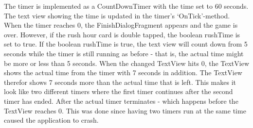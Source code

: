 The timer is implemented as a CountDownTimer with the time set to 60 seconds. The text view showing the time is updated in the timer’s ‘OnTick’-method.  When the timer reaches 0, the FinishDialogFragment appears and the game is over. However, if the rush hour card is double tapped, the boolean rushTime is set to true. If the boolean rushTime is true, the text view will count down from 5 seconds while the timer is still running as before - that is, the actual time might be more or less than 5 seconds. When the changed TextView hits 0, the TextView shows the actual time from the timer with 7 seconds in addition. The TextView therefor shows 7 seconds more than the actual time that is left. This makes it look like two different timers where the first timer continues after the second timer has ended. After the actual timer terminates - which happens before the TextView reaches 0. This was done since having two timers run at the same time caused the application to crash.


